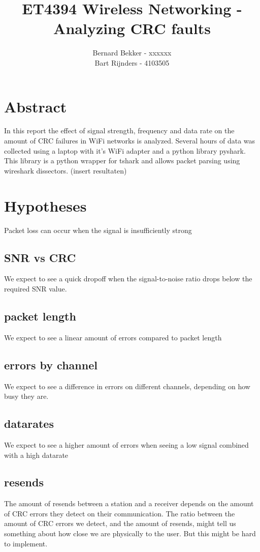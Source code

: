 \documentclass{article}
\title{ET4394 Wireless Networking - Analyzing CRC faults}
\date{}
\author{
Bernard Bekker - xxxxxx \\
Bart Rijnders - 4103505
}
\begin{document}
\maketitle

\section{Abstract}

In this report the effect of signal strength, frequency and data rate on the amount of CRC failures in WiFi networks is analyzed. Several hours of data was collected using a laptop with it's WiFi adapter and a python library pyshark. This library is a python wrapper for tshark and allows packet parsing using wireshark dissectors. (insert resultaten)


\section{Hypotheses}

Packet loss can occur when the signal is insufficiently strong

\subsection{SNR vs CRC}

We expect to see a quick dropoff when the signal-to-noise ratio drops below the required SNR value.

\subsection{packet length}
We expect to see a linear amount of errors compared to packet length

\subsection{errors by channel}
We expect to see a difference in errors on different channels, depending on how busy they are.

\subsection{datarates}
We expect to see a higher amount of errors when seeing a low signal combined with a high datarate

\subsection{resends}
The amount of resends between a station and a receiver depends on the amount of CRC errors they detect on their communication. The ratio between the amount of CRC errors we detect, and the amount of resends, might tell us something about how close we are physically to the user. But this might be hard to implement.
\end{document}

